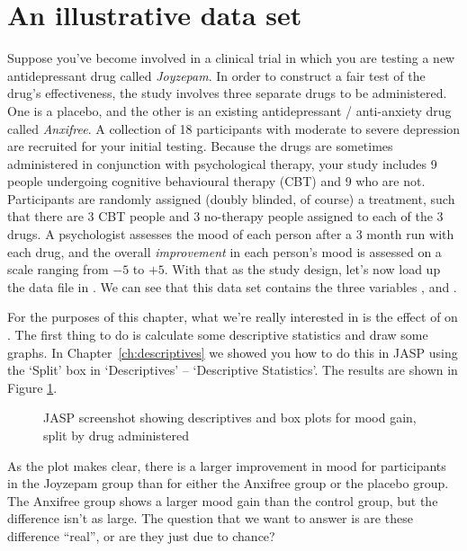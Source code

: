 \section{An illustrative data set~\label{sec:anxifree}}

Suppose you've become involved in a clinical trial in which you are testing a new antidepressant drug called {\it Joyzepam}. In order to construct a fair test of the drug's effectiveness, the study involves three separate drugs to be administered. One is a placebo, and the other is an existing antidepressant / anti-anxiety drug called {\it Anxifree}. A collection of 18 participants with moderate to severe depression are recruited for your initial testing. Because the drugs are sometimes administered in conjunction with psychological therapy, your study includes 9 people undergoing cognitive behavioural therapy (CBT) and 9 who are not. Participants are randomly assigned (doubly blinded, of course) a treatment, such that there are 3 CBT people and 3 no-therapy people assigned to each of the 3 drugs. A psychologist assesses the mood of each person after a 3 month run with each drug, and the overall {\it improvement} in each person's mood is assessed on a scale ranging from $-5$ to $+5$.  With that as the study design, let's now load up the data file in . We can see that this data set contains the three variables ,  and . 

For the purposes of this chapter, what we're really interested in is the effect of  on . The first thing to do is calculate some descriptive statistics and draw some graphs. In Chapter~\ref{ch:descriptives} we showed you how to do this in JASP using the `Split' box in `Descriptives' -- `Descriptive Statistics'. The results are shown in Figure \ref{fig:anova1}.

\begin{figure}[ht]
\begin{center}
\caption{JASP screenshot showing descriptives and box plots for mood gain, split by drug administered}
\HR
\label{fig:anova1}
\end{center}
\end{figure}

As the plot makes clear, there is a larger improvement in mood for participants in the Joyzepam group than for either the Anxifree group or the placebo group. The Anxifree group shows a larger mood gain than the control group, but the difference isn't as large. The question that we want to answer is are these difference ``real'', or are they just due to chance?


